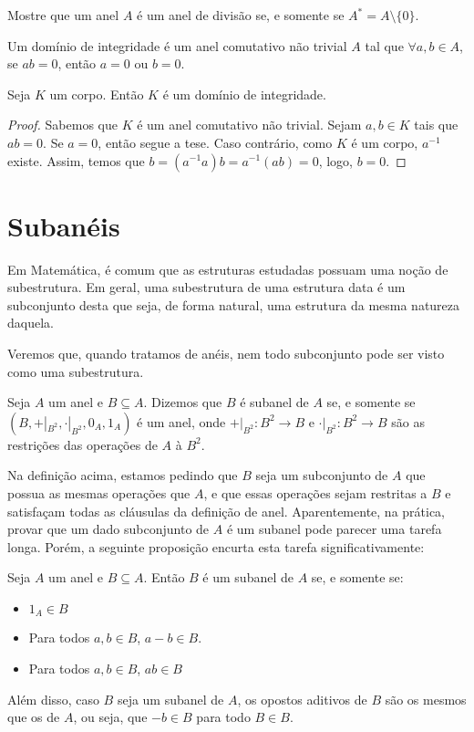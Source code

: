 \begin{exer}
    Mostre que um anel $A$ é um anel de divisão se, e somente se $A^*=A\setminus\{0\}$.
\end{exer}
\begin{definition}
    Um domínio de integridade é um anel comutativo não trivial $A$ tal que $\forall a, b \in A$, se $ab=0$, então $a=0$ ou $b=0$.
\end{definition}

\begin{prop}
    Seja $K$ um corpo.
    Então $K$ é um domínio de integridade.
\end{prop}
\begin{proof}
Sabemos que $K$ é um anel comutativo não trivial.
Sejam $a, b \in K$ tais que $ab=0$.
Se $a=0$, então segue a tese.
Caso contrário, como $K$ é um corpo, $a^{-1}$ existe.
Assim, temos que $b=(a^{-1}a)b=a^{-1}(ab)=0$, logo, $b=0$.
\end{proof}


\section{Subanéis}
Em Matemática, é comum que as estruturas estudadas possuam uma noção de subestrutura.
Em geral, uma subestrutura de uma estrutura data é um subconjunto desta que seja, de forma natural, uma estrutura da mesma natureza daquela.

Veremos que, quando tratamos de anéis, nem todo subconjunto pode ser visto como uma subestrutura.

\begin{definition}[Subanel]
    Seja $A$ um anel e $B \subseteq A$. Dizemos que $B$ é subanel de $A$ se, e somente se $(B, +|_{B^2}, \cdot|_{B^2}, 0_A, 1_A)$ é um anel, onde $+|_{B^2}:B^2\rightarrow B$ e $\cdot|_{B^2}:B^2\rightarrow B$ são as restrições das operações de $A$ à $B^2$.
\end{definition}

Na definição acima, estamos pedindo que $B$ seja um subconjunto de $A$ que possua as mesmas operações que $A$, e que essas operações sejam restritas a $B$ e satisfaçam todas as cláusulas da definição de anel. Aparentemente, na prática, provar que um dado subconjunto de $A$ é um subanel pode parecer uma tarefa longa. Porém, a seguinte proposição encurta esta tarefa significativamente: 

\begin{definition}[Subanel]
    Seja $A$ um anel e $B\subseteq A$. Então $B$ é um subanel de $A$ se, e somente se:
    \begin{itemize}
        \item $1_A \in B$
        \item Para todos $a, b \in B$, $a-b \in B$.
        \item Para todos $a, b \in B$, $ab\in B$
    \end{itemize}

    Além disso, caso $B$ seja um subanel de $A$, os opostos aditivos de $B$ são os mesmos que os de $A$, ou seja, que $-b \in B$ para todo $B \in B$.
\end{definition}


